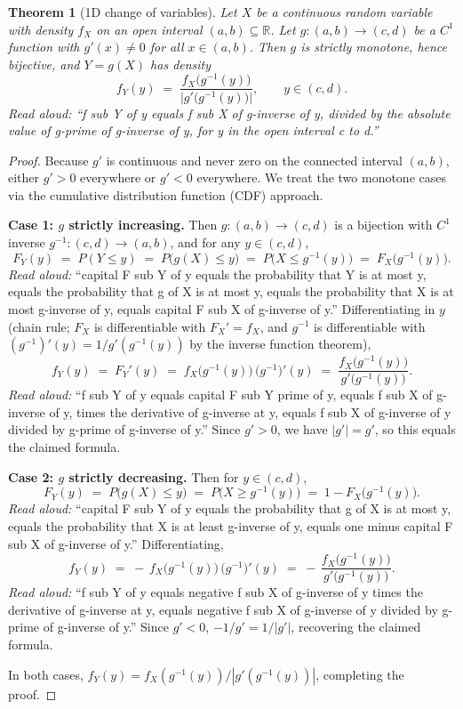 \documentclass[11pt]{article}
\newtheorem{theorem}{Theorem}
\begin{document}
\begin{theorem}[1D change of variables]
\label{thm:1d}
Let $X$ be a continuous random variable with density $f_X$ on an open interval
$(a,b) \subseteq \mathbb{R}$. Let $g : (a,b) \to (c,d)$ be a $C^1$ function with
$g'(x) \neq 0$ for all $x \in (a,b)$. Then $g$ is strictly monotone, hence bijective,
and $Y = g(X)$ has density
\[
f_Y(y) \;=\; \frac{f_X\!\bigl(g^{-1}(y)\bigr)}{\bigl|g'\!\bigl(g^{-1}(y)\bigr)\bigr|},
\qquad y \in (c,d).
\]
\emph{Read aloud:} ``f sub Y of y equals f sub X of g-inverse of y, divided by the absolute value of g-prime of g-inverse of y, for y in the open interval c to d.''
\end{theorem}

\begin{proof}
Because $g'$ is continuous and never zero on the connected interval $(a,b)$, either
$g' > 0$ everywhere or $g' < 0$ everywhere. We treat the two monotone cases via the
cumulative distribution function (CDF) approach.

\medskip
\noindent\textbf{Case 1: $g$ strictly increasing.}
Then $g : (a,b) \to (c,d)$ is a bijection with $C^1$ inverse $g^{-1} : (c,d) \to (a,b)$,
and for any $y \in (c,d)$,
\[
F_Y(y) \;=\; P(Y \le y) \;=\; P\bigl(g(X) \le y\bigr) \;=\; P\bigl(X \le g^{-1}(y)\bigr) \;=\; F_X\!\bigl(g^{-1}(y)\bigr).
\]
\emph{Read aloud:} ``capital F sub Y of y equals the probability that Y is at most y, equals the probability that g of X is at most y, equals the probability that X is at most g-inverse of y, equals capital F sub X of g-inverse of y.''
Differentiating in $y$ (chain rule; $F_X$ is differentiable with $F_X' = f_X$, and
$g^{-1}$ is differentiable with $(g^{-1})'(y) = 1/g'(g^{-1}(y))$ by the inverse function
theorem),
\[
f_Y(y) \;=\; F_Y'(y) \;=\; f_X\!\bigl(g^{-1}(y)\bigr)\,\bigl(g^{-1}\bigr)'(y)
\;=\; \frac{f_X\!\bigl(g^{-1}(y)\bigr)}{g'\!\bigl(g^{-1}(y)\bigr)}.
\]
\emph{Read aloud:} ``f sub Y of y equals capital F sub Y prime of y, equals f sub X of g-inverse of y, times the derivative of g-inverse at y, equals f sub X of g-inverse of y divided by g-prime of g-inverse of y.''
Since $g' > 0$, we have $|g'| = g'$, so this equals the claimed formula.

\medskip
\noindent\textbf{Case 2: $g$ strictly decreasing.}
Then for $y \in (c,d)$,
\[
F_Y(y) \;=\; P\bigl(g(X) \le y\bigr) \;=\; P\bigl(X \ge g^{-1}(y)\bigr) \;=\; 1 - F_X\!\bigl(g^{-1}(y)\bigr).
\]
\emph{Read aloud:} ``capital F sub Y of y equals the probability that g of X is at most y, equals the probability that X is at least g-inverse of y, equals one minus capital F sub X of g-inverse of y.''
Differentiating,
\[
f_Y(y) \;=\; -\, f_X\!\bigl(g^{-1}(y)\bigr)\,\bigl(g^{-1}\bigr)'(y)
\;=\; -\, \frac{f_X\!\bigl(g^{-1}(y)\bigr)}{g'\!\bigl(g^{-1}(y)\bigr)}.
\]
\emph{Read aloud:} ``f sub Y of y equals negative f sub X of g-inverse of y times the derivative of g-inverse at y, equals negative f sub X of g-inverse of y divided by g-prime of g-inverse of y.''
Since $g' < 0$, $-1/g' = 1/|g'|$, recovering the claimed formula.

\medskip
In both cases,
$f_Y(y) = f_X(g^{-1}(y)) / |g'(g^{-1}(y))|$, completing the proof. \qedhere
\end{proof}
\end{document}
